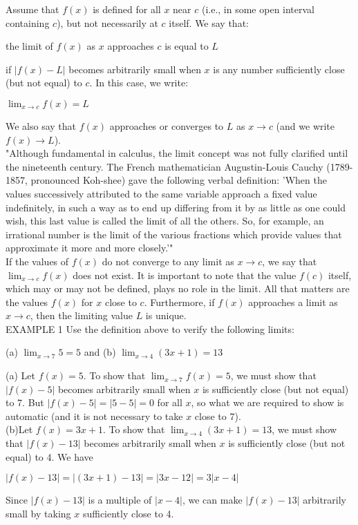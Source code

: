 \documentclass{article}
\begin{document}
Assume that $f(x)$ is defined for all $x$ near $c$ (i.e., in some open interval containing $c$), but not necessarily at $c$ itself. We say that:
\begin{center}the limit of $f(x)$ as $x$ approaches $c$ is equal to $L$\end{center}
if $\left|f(x) - L\right|$ becomes arbitrarily small when $x$ is any number sufficiently close (but not equal) to $c$. In this case, we write:
\begin{center}$\lim_{x \to c}f(x) = L$\end{center}
We also say that $f(x)$ approaches or converges to $L$ as $x \to c$ (and we write $f(x) \to L$).\\

"Although fundamental in calculus, the limit concept was not fully clarified until the nineteenth century. The French mathematician Augustin-Louis Cauchy (1789-1857, pronounced Koh-shee) gave the following verbal definition: 'When the values successively attributed to the same variable approach a fixed value indefinitely, in such a way as to end up differing from it by as little as one could wish, this last value is called the limit of all the others. So, for example, an irrational number is the limit of the various fractions which provide values that approximate it more and more closely.'"\\

If the values of $f(x)$ do not converge to any limit as $x \to c$, we say that $\lim_{x \to c}f(x)$ does not exist. It is important to note that the value $f(c)$ itself, which may or may not be defined, plays no role in the limit. All that matters are the values $f(x)$ for $x$ close to $c$. Furthermore, if $f(x)$ approaches a limit as $x \to c$, then the limiting value $L$ is unique.\\

EXAMPLE 1 Use the definition above to verify the following limits:
\begin{center}
(a) $\lim_{x \to 7}5 = 5$ and (b) $\lim_{x \to 4}(3x + 1) = 13$
\end{center}
(a) Let $f(x) = 5$. To show that $\lim_{x \to 7}f(x) = 5$, we must show that $\left|f(x) - 5\right|$ becomes arbitrarily small when $x$ is sufficiently close (but not equal) to 7. But $\left|f(x)-5\right| = \left|5 - 5\right| = 0$ for all $x$, so what we are required to show is automatic (and it is not necessary to take $x$ close to 7).\\

\noindent(b)Let $f(x) = 3x+1$. To show that $\lim_{x \to 4}(3x + 1) = 13$, we must show that $\left|f(x) - 13\right|$ becomes arbitrarily small when $x$ is sufficiently close (but not equal) to 4. We have
\begin{center}$\left|f(x) - 13\right| = \left|(3x+1) - 13\right| = \left|3x - 12\right| = 3\left|x - 4\right|$\end{center}
Since $\left|f(x) - 13\right|$ is a multiple of $\left|x - 4\right|$, we can make $\left|f(x) - 13\right|$ arbitrarily small by taking $x$ sufficiently close to 4.\\
\end{document}
